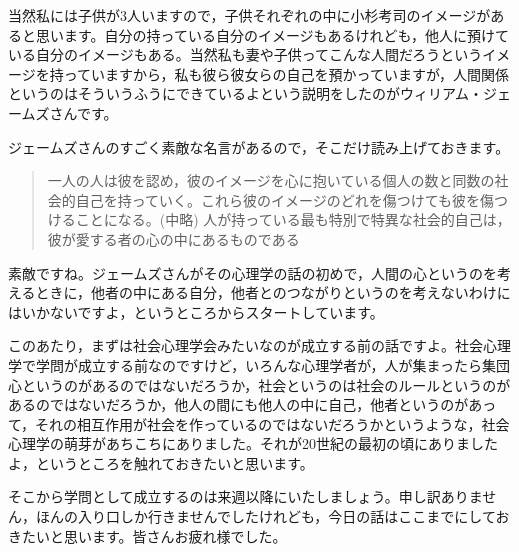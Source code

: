 \documentclass{ltjsbook}
\begin{document}
当然私には子供が3人いますので，子供それぞれの中に小杉考司のイメージがあると思います。自分の持っている自分のイメージもあるけれども，他人に預けている自分のイメージもある。当然私も妻や子供ってこんな人間だろうというイメージを持っていますから，私も彼ら彼女らの自己を預かっていますが，人間関係というのはそういうふうにできているよという説明をしたのがウィリアム・ジェームズさんです。

ジェームズさんのすごく素敵な名言があるので，そこだけ読み上げておきます。

\begin{quote}
    一人の人は彼を認め，彼のイメージを心に抱いている個人の数と同数の社会的自己を持っていく。これら彼のイメージのどれを傷つけても彼を傷つけることになる。(中略)
人が持っている最も特別で特異な社会的自己は，彼が愛する者の心の中にあるものである
\end{quote}

素敵ですね。ジェームズさんがその心理学の話の初めで，人間の心というのを考えるときに，他者の中にある自分，他者とのつながりというのを考えないわけにはいかないですよ，というところからスタートしています。

このあたり，まずは社会心理学会みたいなのが成立する前の話ですよ。社会心理学で学問が成立する前なのですけど，いろんな心理学者が，人が集まったら集団心というのがあるのではないだろうか，社会というのは社会のルールというのがあるのではないだろうか，他人の間にも他人の中に自己，他者というのがあって，それの相互作用が社会を作っているのではないだろうかというような，社会心理学の萌芽があちこちにありました。それが20世紀の最初の頃にありましたよ，というところを触れておきたいと思います。

そこから学問として成立するのは来週以降にいたしましょう。申し訳ありません，ほんの入り口しか行きませんでしたけれども，今日の話はここまでにしておきたいと思います。皆さんお疲れ様でした。
\end{document}
